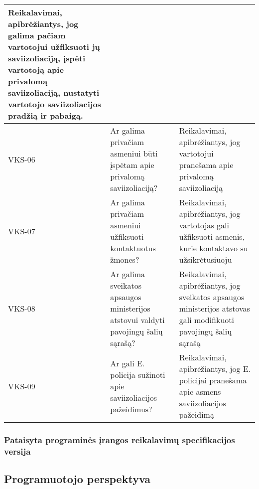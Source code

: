 \documentclass{VUMIFPSkursinis}
\begin{document}
\begin{center}
\begin{longtable}{|C{2cm}|L{5cm}|L{8cm}|}
		Reikalavimai, apibrėžiantys, jog galima pačiam vartotojui užfiksuoti jų saviizoliaciją, įspėti vartotoją apie privalomą saviizoliaciją, nustatyti vartotojo saviizoliacijos pradžią ir pabaigą. \\ \hline
		VKS-06                                                                                        &
		Ar galima privačiam asmeniui būti įspėtam apie privalomą saviizoliaciją?                      &
		Reikalavimai, apibrėžiantys, jog vartotojui pranešama apie privalomą saviizoliaciją                                                                                                             \\ \hline
		VKS-07                                                                                        &
		Ar galima privačiam asmeniui užfiksuoti kontaktuotus žmones?                                  &
		Reikalavimai, apibrėžiantys, jog vartotojas gali užfiksuoti asmenis, kurie kontaktavo su užsikrėtusiuoju                                                                                        \\ \hline
		VKS-08                                                                                        &
		Ar galima sveikatos apsaugos ministerijos atstovui valdyti pavojingų šalių sąrašą?            &
		Reikalavimai, apibrėžiantys, jog sveikatos apsaugos ministerijos atstovas gali modifikuoti pavojingų šalių sąrašą                                                                               \\ \hline
		VKS-09                                                                                        &
		Ar gali E. policija sužinoti apie saviizoliacijos pažeidimus?                                 &
		Reikalavimai, apibrėžiantys, jog E. policijai pranešama apie asmens saviizoliacijos pažeidimą                                                                                                   \\ \hline
	\end{longtable}
\end{center}

\subsubsection{Pataisyta programinės įrangos reikalavimų specifikacijos versija}

\subsection{Programuotojo perspektyva}
\end{document}
